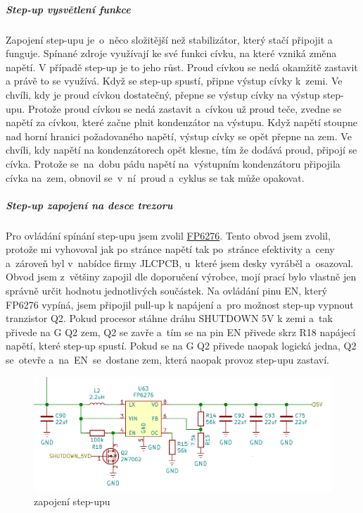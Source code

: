 \subparagraph*{Step-up vysvětlení funkce}
Zapojení step-upu je~o~něco složitější než stabilizátor, který stačí připojit a funguje. Spínané zdroje využívají ke své funkci cívku, na které
vzniká změna napětí. V případě step-up je to jeho růst. Proud cívkou se nedá okamžitě zastavit a právě to se využívá. 
Když se step-up spustí, připne výstup cívky k~zemi. Ve chvíli, kdy je proud cívkou dostatečný, přepne se výstup cívky na výstup step-upu.
Protože proud cívkou se nedá zastavit a~cívkou už proud teče, zvedne se napětí za cívkou, které začne plnit kondenzátor na výstupu.
Když napětí stoupne nad horní hranici požadovaného napětí, výstup cívky se opět přepne na zem. Ve chvíli, kdy napětí na kondenzátorech opět 
klesne, tím že dodává proud, připojí se cívka. Protože se~na~dobu pádu napětí na~výstupním kondenzátoru připojila cívka na~zem, obnovil 
se~v~ní~proud a~cyklus se tak může opakovat.


\subparagraph*{Step-up zapojení na desce trezoru} 

Pro ovládání spínání step-upu jsem zvolil \href{https://datasheet.lcsc.com/szlcsc/Feeling-Tech-FP6276AXR-G1_C83308.pdf}{FP6276}.
Tento obvod jsem zvolil, protože mi vyhovoval jak po stránce napětí tak po~stránce efektivity a~ceny a~zároveň byl v~nabídce firmy JLCPCB,
u~které jsem desky vyráběl a~osazoval. 
Obvod jsem z~většiny zapojil dle doporučení výrobce, mojí prací bylo vlastně jen správně určit hodnotu 
jednotlivých součástek. Na ovládání pinu EN, který FP6276 vypíná, jsem připojil pull-up k napájení a~pro možnost step-up vypnout tranzistor Q2. 
Pokud procesor stáhne dráhu SHUTDOWN 5V k zemi a~tak přivede na G Q2 zem, Q2 se zavře a~tím se na pin EN přivede skrz R18 napájecí napětí, 
které step-up spustí. Pokud se na G Q2 přivede naopak logická jedna, Q2 se~otevře a~na~EN~se~dostane zem, která naopak provoz step-upu zastaví.

\begin{figure}[htbp]
    \centering
    \includegraphics[width=400pt]{kapitoly/obrazky/E4/napajeni/step-up.png}
    \caption{zapojení step-upu}
    \label{fig:E4-step-up}
\end{figure}

